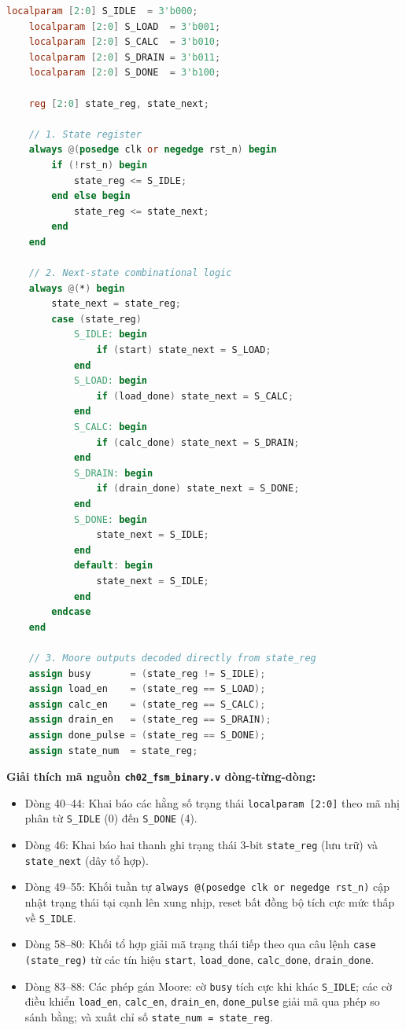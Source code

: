 \begin{lstlisting}[language=Verilog, firstnumber=40, caption={Mã nguồn FSM 5 trạng thái mã hóa nhị phân Minimal Bits (rtl/v3/ch02\_fsm\_binary.v)}]
    localparam [2:0] S_IDLE  = 3'b000;
    localparam [2:0] S_LOAD  = 3'b001;
    localparam [2:0] S_CALC  = 3'b010;
    localparam [2:0] S_DRAIN = 3'b011;
    localparam [2:0] S_DONE  = 3'b100;

    reg [2:0] state_reg, state_next;

    // 1. State register
    always @(posedge clk or negedge rst_n) begin
        if (!rst_n) begin
            state_reg <= S_IDLE;
        end else begin
            state_reg <= state_next;
        end
    end

    // 2. Next-state combinational logic
    always @(*) begin
        state_next = state_reg;
        case (state_reg)
            S_IDLE: begin
                if (start) state_next = S_LOAD;
            end
            S_LOAD: begin
                if (load_done) state_next = S_CALC;
            end
            S_CALC: begin
                if (calc_done) state_next = S_DRAIN;
            end
            S_DRAIN: begin
                if (drain_done) state_next = S_DONE;
            end
            S_DONE: begin
                state_next = S_IDLE;
            end
            default: begin
                state_next = S_IDLE;
            end
        endcase
    end

    // 3. Moore outputs decoded directly from state_reg
    assign busy       = (state_reg != S_IDLE);
    assign load_en    = (state_reg == S_LOAD);
    assign calc_en    = (state_reg == S_CALC);
    assign drain_en   = (state_reg == S_DRAIN);
    assign done_pulse = (state_reg == S_DONE);
    assign state_num  = state_reg;
\end{lstlisting}

\textbf{Giải thích mã nguồn \texttt{ch02\_fsm\_binary.v} dòng-từng-dòng:}
\begin{itemize}[leftmargin=1.5em, itemsep=2pt]
    \item Dòng 40--44: Khai báo các hằng số trạng thái \texttt{localparam [2:0]} theo mã nhị phân từ \texttt{S\_IDLE} (0) đến \texttt{S\_DONE} (4).
    \item Dòng 46: Khai báo hai thanh ghi trạng thái 3-bit \texttt{state\_reg} (lưu trữ) và \texttt{state\_next} (dây tổ hợp).
    \item Dòng 49--55: Khối tuần tự \texttt{always @(posedge clk or negedge rst\_n)} cập nhật trạng thái tại cạnh lên xung nhịp, reset bất đồng bộ tích cực mức thấp về \texttt{S\_IDLE}.
    \item Dòng 58--80: Khối tổ hợp giải mã trạng thái tiếp theo qua câu lệnh \texttt{case (state\_reg)} từ các tín hiệu \texttt{start}, \texttt{load\_done}, \texttt{calc\_done}, \texttt{drain\_done}.
    \item Dòng 83--88: Các phép gán Moore: cờ \texttt{busy} tích cực khi khác \texttt{S\_IDLE}; các cờ điều khiển \texttt{load\_en}, \texttt{calc\_en}, \texttt{drain\_en}, \texttt{done\_pulse} giải mã qua phép so sánh bằng; và xuất chỉ số \texttt{state\_num = state\_reg}.
\end{itemize}

